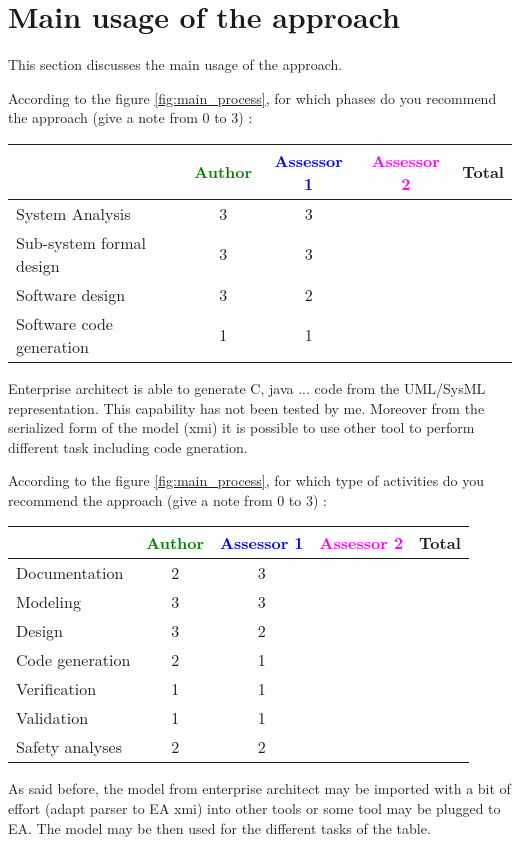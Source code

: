 \section{Main usage of the approach}
\label{main_usage}
This section discusses the main usage of the approach.

According to the figure \ref{fig:main_process}, for which phases do you recommend the approach (give a note from 0 to  3) :

\begin{tabular}{|l | c | c | c | c|}
\hline
& \textcolor{green}{Author} & \textcolor{blue}{Assessor 1} & \textcolor{magenta}{Assessor 2} & Total \\
\hline 
System Analysis & 3  & 3 & &  \\
\hline
Sub-system formal design & 3 & 3 & & \\
\hline
Software design & 3 & 2 & & \\
\hline
Software code generation & 1 & 1 & & \\
\hline
\end{tabular}
\begin{author_comment}
Enterprise architect is able to generate C, java ... code from the UML/SysML
representation. This capability has not been tested by me. Moreover
from the serialized form of the model (xmi) it is possible to use
other tool to perform different task including code gneration.
\end{author_comment}
According to the figure \ref{fig:main_process}, for which type of activities do you recommend the approach (give a note from 0 to  3) :

\begin{tabular}{|l | c | c | c | c|}
\hline
& \textcolor{green}{Author} & \textcolor{blue}{Assessor 1} & \textcolor{magenta}{Assessor 2} & Total \\
\hline 
Documentation &2 & 3 & &  \\
\hline
Modeling & 3 & 3 & &  \\
\hline
Design &3 & 2 & & \\
\hline
Code generation &2 & 1 & & \\
\hline
Verification & 1 & 1 & & \\
\hline
Validation & 1 & 1 & & \\
\hline
Safety analyses & 2 & 2 & & \\
\hline
\end{tabular}
\begin{author_comment}
As said before, the model from enterprise architect may be imported
with a bit of effort (adapt parser to EA xmi) into other tools or some
tool may be plugged to EA. The model may be then used for the
different tasks of the table.
\end{author_comment}


